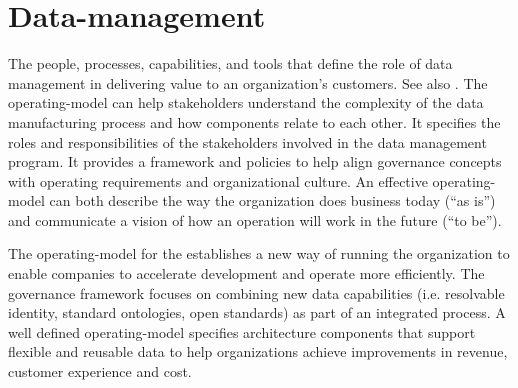 \section[Operating Model]{Data-management }\label{sec:ekgmm-b-4-1} %

The people, processes, capabilities, and tools that define the role of data management in delivering value to an
organization’s customers.
See also .
The \gls{operating-model} can help stakeholders understand the complexity of the data manufacturing process and how
components relate to each other.
It specifies the roles and responsibilities of the stakeholders involved in the data management program.
It provides a framework and policies to help align governance concepts with operating requirements and
organizational culture.
An effective \gls{operating-model} can both describe the way the organization does business today (“as is”) and
communicate a vision of how an operation will work in the future (“to be”).

\ekgmmContextSection

The \gls{operating-model} for the  establishes a new way of running the organization to enable companies to
accelerate development and operate more efficiently.
The  governance framework focuses on combining new data capabilities (i.e. resolvable identity,
standard ontologies, open standards) as part of an integrated process.
A well defined \gls{operating-model} specifies architecture components that support flexible and reusable data to help
organizations achieve improvements in revenue, customer experience and cost.

\kgmmcorequestionssection

